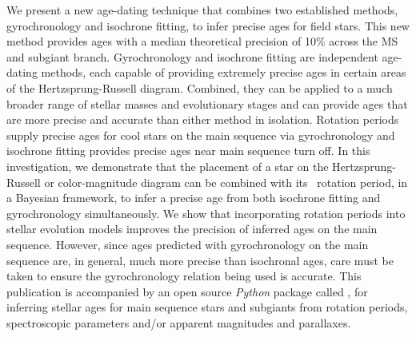 We present a new age-dating technique that combines two established methods,
gyrochronology and isochrone fitting, to infer precise ages for field stars.
This new method provides ages with a median theoretical precision of 10\%
across the MS and subgiant branch.
Gyrochronology and isochrone fitting are independent age-dating methods, each
capable of providing extremely precise ages in certain areas of the
Hertzsprung-Russell diagram.
Combined, they can be applied to a much broader range of stellar masses and
evolutionary stages and can provide ages that are more precise and accurate
than either method in isolation.
Rotation periods supply precise ages for cool stars on the main sequence via
gyrochronology and isochrone fitting provides precise ages near main sequence
turn off.
In this investigation, we demonstrate that the placement of a star on the
Hertzsprung-Russell or color-magnitude diagram
can be combined with its \kepler\ rotation period, in a Bayesian framework, to
infer a precise age from both isochrone fitting and gyrochronology
simultaneously.
We show that incorporating rotation periods into stellar evolution models
improves the precision of inferred ages on the main sequence.
However, since ages predicted with gyrochronology on the main sequence are, in
general, much more precise than isochronal ages, care must be taken to ensure
the gyrochronology relation being used is accurate.
This publication is accompanied by an open source {\it Python} package called
\sd, for inferring stellar ages for main sequence stars and subgiants from
rotation periods, spectroscopic parameters and/or apparent magnitudes and
parallaxes.
